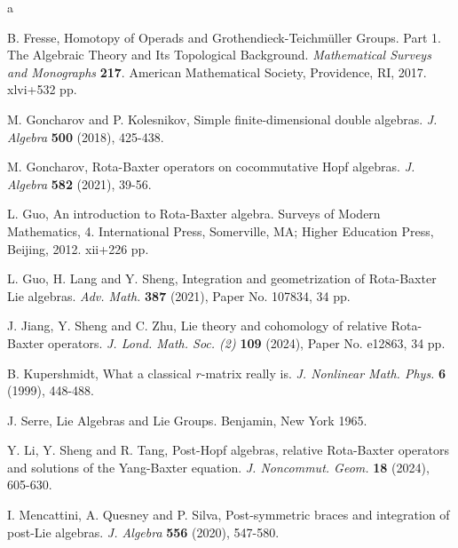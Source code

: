 \documentclass[12pt]{amsart}
\theoremstyle{definition}   %
\begin{document}
\begin{thebibliography}{a}

B. Fresse, Homotopy of Operads and Grothendieck-Teichm\"uller Groups. Part 1. The Algebraic Theory and Its Topological Background. {\em Mathematical Surveys and Monographs} {\bf 217}. American Mathematical Society, Providence, RI, 2017. xlvi+532 pp.

 M. Goncharov and P.  Kolesnikov, Simple finite-dimensional double algebras. \emph{J. Algebra} \textbf{500} (2018), 425-438.

 M. Goncharov, Rota-Baxter operators on cocommutative Hopf algebras. \textit{J. Algebra} {\bf 582} (2021), 39-56.

L. Guo,  An introduction to Rota-Baxter algebra. Surveys of Modern Mathematics, 4. International Press, Somerville, MA; Higher Education Press, Beijing, 2012. xii+226 pp.

L. Guo, H. Lang and Y. Sheng, Integration and geometrization of Rota-Baxter Lie algebras.  {\em Adv. Math.}  {\bf387} (2021), Paper No. 107834, 34 pp.


 J. Jiang, Y. Sheng and C. Zhu, Lie theory and cohomology of relative Rota-Baxter operators.  {\em J. Lond. Math. Soc. (2)} {\bf109} (2024),  Paper No. e12863, 34 pp.

B.  Kupershmidt, What a classical $r$-matrix really is. \emph{J. Nonlinear Math. Phys.} {\bf 6} (1999), 448-488.

 J. Serre, Lie Algebras and Lie Groups. Benjamin, New York 1965.

Y. Li, Y. Sheng and R. Tang, Post-Hopf algebras, relative Rota-Baxter operators and solutions of the Yang-Baxter equation. {\em J. Noncommut. Geom.} {\bf18} (2024), 605-630.


 I. Mencattini, A. Quesney and P. Silva,  Post-symmetric braces and integration of post-Lie algebras. \emph{J. Algebra} {\bf556} (2020), 547-580.


\end{thebibliography}
\end{document}
